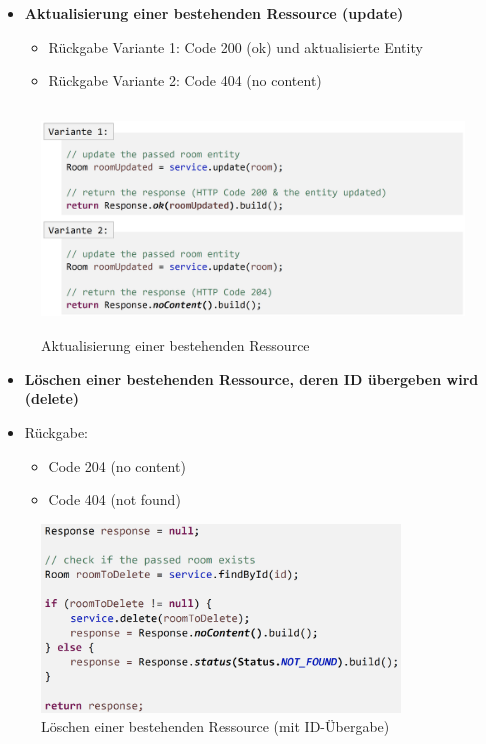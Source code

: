 \documentclass[a4paper]{article}
\begin{document}
		
			\begin{itemize}
				\item \textbf{Aktualisierung einer bestehenden Ressource (update)}
				\begin{itemize}
					\item Rückgabe Variante 1: Code 200 (ok) und aktualisierte Entity
					\item Rückgabe Variante 2: Code 404 (no content)
				\end{itemize}
			\end{itemize}
			\begin{figure}[!htb]
				\centering
				\includegraphics[keepaspectratio, height=6cm]{img/ws/resp_02.png}
				\caption{Aktualisierung einer bestehenden Ressource}
				\label{fig:resp_02}
			\end{figure}
		
		\newpage
		
			\begin{itemize}
				\item \textbf{Löschen einer bestehenden Ressource, deren ID übergeben wird (delete)}
				\item Rückgabe:
				\begin{itemize}
					\item Code 204 (no content)
					\item Code 404 (not found)
				\end{itemize}
			\end{itemize}
			\begin{figure}[!htb]
				\centering
				\includegraphics[keepaspectratio, height=5cm]{img/ws/resp_03.png}
				\caption{Löschen einer bestehenden Ressource (mit ID-Übergabe)}
				\label{fig:resp_03}
			\end{figure}
		
\end{document}

